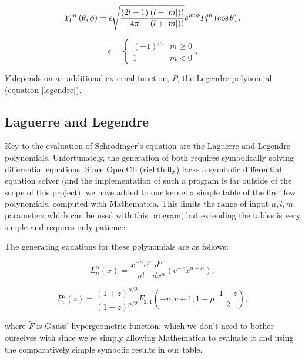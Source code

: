 \documentclass{acmsiggraph}
\begin{document}
\begin{equation}\label{yFunc}
Y_l^m\left(\theta,\phi\right)=\epsilon
\sqrt{\frac{\left(2l+1\right)}{4\pi}
    \frac{\left(l-\left|m\right|\right)!}{\left(l+\left|m\right|\right)!}}
\mathit{e}^{{\rm i}m\phi}
P^m_l\left(\cos\theta\right),
\end{equation}

\begin{equation}\label{yEpsilon}
\epsilon=\begin{cases}
\left(-1\right)^m & \text{$m\ge0$} \\
1 & \text{$m<0$}
\end{cases}.
\end{equation}

$Y$ depends on an additional external function, $P$, the Legendre polynomial (equation \ref{legendre}).

\subsection{Laguerre and Legendre}

\label{laguerreLegendre}

Key to the evaluation of Schr\"{o}dinger's equation are the Laguerre and Legendre polynomials. Unfortunately, the generation of both requires symbolically solving differential equations. \cite{legendreCite} Since OpenCL (rightfully) lacks a symbolic differential equation solver (and the implementation of such a program is far outside of the scope of this project), we have added to our kernel a simple table of the first few polynomials, computed with Mathematica. This limits the range of input $n, l, m$ parameters which can be used with this program, but extending the tables is very simple and requires only patience.

The generating equations for these polynomials are as follows:

\begin{equation}\label{laguerre}
L^\alpha_n\left(x\right)=\frac{x^{-\alpha}e^x}{n!}\frac{d^n}{dx^n}\left(e^{-x}x^{n+\alpha}\right),
\end{equation}

\begin{equation}\label{legendre}
P^u_v\left(z\right)=\frac{\left(1+z\right)^{\mu/2}}{\left(1-z\right)^{\mu/2}}
\tilde{F}_{2,1}
\left(-v,v+1;1-\mu;\frac{1-z}{2}\right),
\end{equation}

where $\tilde{F}$ is Gauss' hypergeometric function, which we don't need to bother ourselves with since we're simply allowing Mathematica to evaluate it and using the comparatively simple symbolic results in our table.
\end{document}
